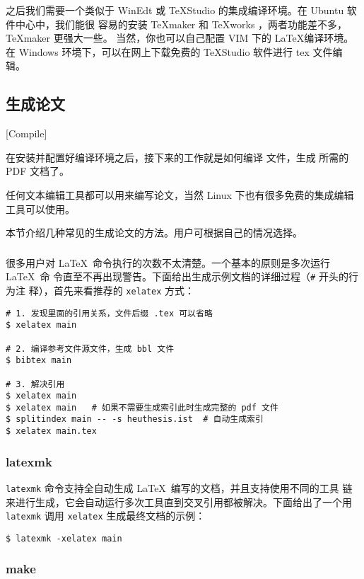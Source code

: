 之后我们需要一个类似于 WinEdt 或 TeXStudio 的集成编译环境。在 Ubuntu 软件中心中，我们能很
容易的安装 \TeX{}maker 和 \TeX{}works ，两者功能差不多， \TeX{}maker 更强大一些。
当然，你也可以自己配置 VIM 下的 \LaTeX{}编译环境。在 Windows 环境下，可以在网上下载免费的
TeXStudio 软件进行 tex 文件编辑。

\subsection{生成论文}[Compile]
\label{sec:generate-thesis}

在安装并配置好编译环境之后，接下来的工作就是如何编译 \XeLaTeX{} 文件，生成
所需的 PDF 文档了。

任何文本编辑工具都可以用来编写论文，当然 Linux 下也有很多免费的集成编辑工具可以使用。

本节介绍几种常见的生成论文的方法。用户可根据自己的情况选择。

\subsubsection{\XeLaTeX}
\label{sec:xelatex}

很多用户对 \LaTeX\ 命令执行的次数不太清楚。一个基本的原则是多次运行 \LaTeX\ 命
令直至不再出现警告。下面给出生成示例文档的详细过程（\texttt{\#} 开头的行为注
释），首先来看推荐的 \texttt{xelatex} 方式：
\begin{lstlisting}
# 1. 发现里面的引用关系，文件后缀 .tex 可以省略
$ xelatex main

# 2. 编译参考文件源文件，生成 bbl 文件
$ bibtex main

# 3. 解决引用
$ xelatex main
$ xelatex main   # 如果不需要生成索引此时生成完整的 pdf 文件
$ splitindex main -- -s heuthesis.ist  # 自动生成索引
$ xelatex main.tex
\end{lstlisting}

\subsubsection{latexmk}
\label{sec:latexmk}

\texttt{latexmk} 命令支持全自动生成 \LaTeX\ 编写的文档，并且支持使用不同的工具
链来进行生成，它会自动运行多次工具直到交叉引用都被解决。下面给出了一个用
\texttt{latexmk} 调用 \texttt{xelatex} 生成最终文档的示例：
\begin{lstlisting}
$ latexmk -xelatex main
\end{lstlisting}

\subsubsection{make}
\label{sec:make}

